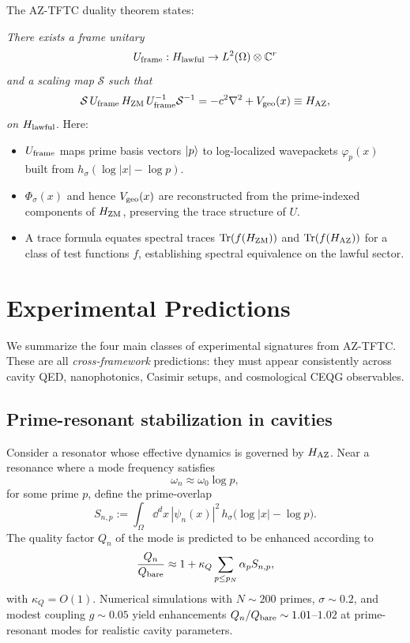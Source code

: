 \documentclass[11pt]{article}
\begin{document}
The AZ-TFTC duality theorem states:

\medskip
\noindent\emph{There exists a frame unitary}
\begin{equation}
U_{\rm frame}: H_{\rm lawful} \to L^2(\Omega)\otimes\mathbb{C}^r
\end{equation}
\emph{and a scaling map} $\mathcal{S}$ \emph{such that}
\begin{equation}
\mathcal{S}\,U_{\rm frame}\,H_{\rm ZM}\,U_{\rm frame}^{-1}\mathcal{S}^{-1}
  = -c^2\nabla^2 + V_{\rm geo}(x)
  \equiv H_{\rm AZ},
\end{equation}
\emph{on $H_{\rm lawful}$}.
Here:
\begin{itemize}
  \item $U_{\rm frame}$ maps prime basis vectors $\ket{p}$ to log-localized wavepackets $\varphi_p(x)$ built from $h_\sigma(\log|x|-\log p)$.
  \item $\Phi_\sigma(x)$ and hence $V_{\rm geo}(x)$ are reconstructed from the prime-indexed components of $H_{\rm ZM}$, preserving the trace structure of $U$.
  \item A trace formula equates spectral traces $\text{Tr}(f(H_{\rm ZM}))$ and $\text{Tr}(f(H_{\rm AZ}))$ for a class of test functions $f$, establishing spectral equivalence on the lawful sector.
\end{itemize}

\section{Experimental Predictions}

We summarize the four main classes of experimental signatures from AZ-TFTC.
These are all \emph{cross-framework} predictions: they must appear consistently across cavity QED, nanophotonics, Casimir setups, and cosmological CEQG observables.\cite{CEQG,CasimirReview,AdvancesCasimir}

\subsection{Prime-resonant stabilization in cavities}

Consider a resonator whose effective dynamics is governed by $H_{\rm AZ}$.
Near a resonance where a mode frequency satisfies
\begin{equation}
\omega_n \approx \omega_0 \log p,
\end{equation}
for some prime $p$, define the prime-overlap
\begin{equation}
S_{n,p} := \int_{\Omega} \dd^d x\, |\psi_n(x)|^2\,h_\sigma\bigl(\log|x|-\log p\bigr).
\end{equation}
The quality factor $Q_n$ of the mode is predicted to be enhanced according to
\begin{equation}
\frac{Q_n}{Q_{\rm bare}}
  \approx 1 + \kappa_Q \sum_{p\le p_N}\alpha_p S_{n,p},
\end{equation}
with $\kappa_Q = O(1)$.
Numerical simulations with $N\sim 200$ primes, $\sigma\sim 0.2$, and modest coupling $g\sim 0.05$ yield enhancements $Q_n/Q_{\rm bare}\sim 1.01$--$1.02$ at prime-resonant modes for realistic cavity parameters.
\end{document}
